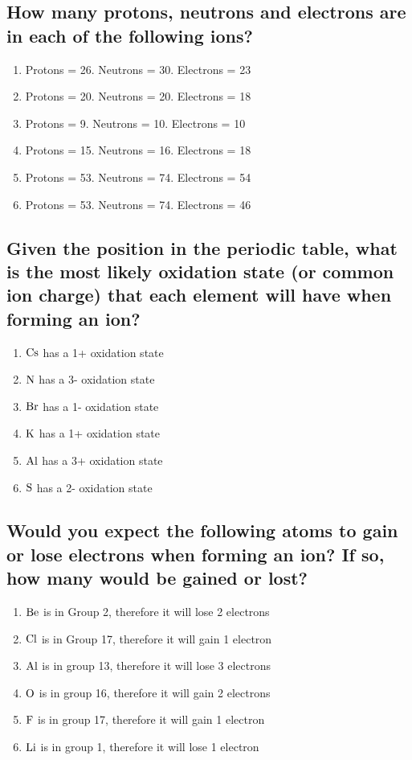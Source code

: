 \documentclass[11pt]{article}
\begin{document}
\subsection{How many protons, neutrons and electrons are in each of the following ions?}
\label{sec:org1940d30}
\begin{enumerate}
\item Protons = 26. Neutrons = 30. Electrons = 23
\item Protons = 20. Neutrons = 20. Electrons = 18
\item Protons = 9. Neutrons = 10. Electrons = 10
\item Protons = 15. Neutrons = 16. Electrons = 18
\item Protons = 53. Neutrons = 74. Electrons = 54
\item Protons = 53. Neutrons = 74. Electrons = 46
\end{enumerate}

\subsection{Given the position in the periodic table, what is the most likely oxidation state (or common ion charge) that each element will have when forming an ion?}
\label{sec:org3a354c9}
\begin{enumerate}
\item \(\ce{Cs}\) has a 1+ oxidation state
\item \(\ce{N}\) has a 3- oxidation state
\item \(\ce{Br}\) has a 1- oxidation state
\item \(\ce{K}\) has a 1+ oxidation state
\item \(\ce{Al}\) has a 3+ oxidation state
\item \(\ce{S}\) has a 2- oxidation state
\end{enumerate}

\subsection{Would you expect the following atoms to gain or lose electrons when forming an ion? If so, how many would be gained or lost?}
\label{sec:orga9b9cea}
\begin{enumerate}
\item \(\ce{Be}\) is in Group 2, therefore it will lose 2 electrons
\item \(\ce{Cl}\) is in Group 17, therefore it will gain 1 electron
\item \(\ce{Al}\) is in group 13, therefore it will lose 3 electrons
\item \(\ce{O}\) is in group 16, therefore it will gain 2 electrons
\item \(\ce{F}\) is in group 17, therefore it will gain 1 electron
\item \(\ce{Li}\) is in group 1, therefore it will lose 1 electron
\end{enumerate}
\end{document}
